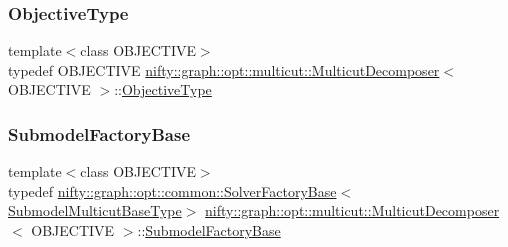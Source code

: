 \subsubsection{\texorpdfstring{Objective\+Type}{ObjectiveType}}
{\footnotesize\ttfamily template$<$class O\+B\+J\+E\+C\+T\+I\+VE$>$ \\
typedef O\+B\+J\+E\+C\+T\+I\+VE \hyperlink{classnifty_1_1graph_1_1opt_1_1multicut_1_1MulticutDecomposer}{nifty\+::graph\+::opt\+::multicut\+::\+Multicut\+Decomposer}$<$ O\+B\+J\+E\+C\+T\+I\+VE $>$\+::\hyperlink{classnifty_1_1graph_1_1opt_1_1multicut_1_1MulticutDecomposer_ab70024cf8bdd7baea7842c33de022ffd}{Objective\+Type}}

\mbox{\label{classnifty_1_1graph_1_1opt_1_1multicut_1_1MulticutDecomposer_a7b25dc946b8d2e57e76ab54bca655f63}} 
\subsubsection{\texorpdfstring{Submodel\+Factory\+Base}{SubmodelFactoryBase}}
{\footnotesize\ttfamily template$<$class O\+B\+J\+E\+C\+T\+I\+VE$>$ \\
typedef \hyperlink{classnifty_1_1graph_1_1opt_1_1common_1_1SolverFactoryBase}{nifty\+::graph\+::opt\+::common\+::\+Solver\+Factory\+Base}$<$\hyperlink{classnifty_1_1graph_1_1opt_1_1multicut_1_1MulticutDecomposer_a6323facd0866e8847a555dc975c6daf8}{Submodel\+Multicut\+Base\+Type}$>$ \hyperlink{classnifty_1_1graph_1_1opt_1_1multicut_1_1MulticutDecomposer}{nifty\+::graph\+::opt\+::multicut\+::\+Multicut\+Decomposer}$<$ O\+B\+J\+E\+C\+T\+I\+VE $>$\+::\hyperlink{classnifty_1_1graph_1_1opt_1_1multicut_1_1MulticutDecomposer_a7b25dc946b8d2e57e76ab54bca655f63}{Submodel\+Factory\+Base}}

\mbox{\label{classnifty_1_1graph_1_1opt_1_1multicut_1_1MulticutDecomposer_a0b5a0c20681704250c2762b807a9789b}} 
